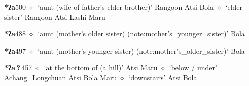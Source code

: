   \begin{list}{}{\leftmargin=1.5em \itemindent=-1.5em}
  \item {\footnotesize \textbf{*ʔa}}{\tiny 500}
         $\diamond$~`aunt (wife of father's elder brother)'
         Rangoon 
\hspace{1ex}
         Atsi 
\hspace{1ex}
         Bola 
\hspace{1ex}
         $\diamond$~`elder sister'
         Rangoon 
\hspace{1ex}
         Atsi 
\hspace{1ex}
         Lashi 
\hspace{1ex}
         Maru 
  \item {\footnotesize \textbf{*ʔa}}{\tiny 488}
\hspace{1ex}
         $\diamond$~`aunt (mother's older sister) (note:mother's_younger_sister)'
         Bola 
  \item {\footnotesize \textbf{*ʔa}}{\tiny 497}
\hspace{1ex}
         $\diamond$~`aunt (mother's younger sister) (note:mother's_older_sister)'
         Bola 
  \item {\footnotesize \textbf{*ʔa\,?\,}}{\tiny 457}
\hspace{1ex}
         $\diamond$~`at the bottom of (a hill)'
         Atsi 
\hspace{1ex}
         Maru 
\hspace{1ex}
         $\diamond$~`below / under'
         Achang\_Longchuan 
\hspace{1ex}
         Atsi 
\hspace{1ex}
         Bola 
\hspace{1ex}
         Maru 
\hspace{1ex}
         $\diamond$~`downstairs'
         Atsi 
\hspace{1ex}
         Bola 

\end{list}
